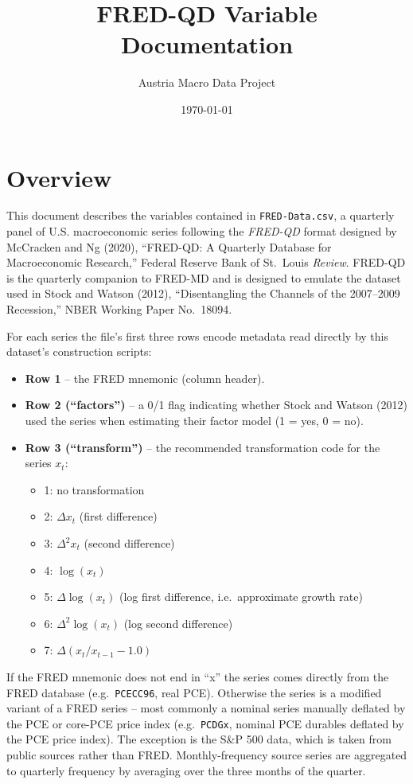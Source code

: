 \documentclass[11pt]{article}
\title{FRED-QD Variable Documentation}
\author{Austria Macro Data Project}
\date{\today}
\begin{document}
\maketitle

\section*{Overview}

This document describes the variables contained in \texttt{FRED-Data.csv}, a
quarterly panel of U.S. macroeconomic series following the \emph{FRED-QD}
format designed by McCracken and Ng (2020), ``FRED-QD: A Quarterly Database
for Macroeconomic Research,'' Federal Reserve Bank of St.\ Louis \emph{Review}.
FRED-QD is the quarterly companion to FRED-MD and is designed to emulate the
dataset used in Stock and Watson (2012), ``Disentangling the Channels of the
2007--2009 Recession,'' NBER Working Paper No.\ 18094.

For each series the file's first three rows encode metadata read directly by
this dataset's construction scripts:
\begin{itemize}
  \item \textbf{Row 1} -- the FRED mnemonic (column header).
  \item \textbf{Row 2 (``factors'')} -- a 0/1 flag indicating whether Stock
    and Watson (2012) used the series when estimating their factor model
    (1 = yes, 0 = no).
  \item \textbf{Row 3 (``transform'')} -- the recommended transformation
    code for the series $x_t$:
    \begin{itemize}
      \item 1: no transformation
      \item 2: $\Delta x_t$ (first difference)
      \item 3: $\Delta^2 x_t$ (second difference)
      \item 4: $\log(x_t)$
      \item 5: $\Delta \log(x_t)$ (log first difference, i.e.\ approximate growth rate)
      \item 6: $\Delta^2 \log(x_t)$ (log second difference)
      \item 7: $\Delta(x_t/x_{t-1} - 1.0)$
    \end{itemize}
\end{itemize}

If the FRED mnemonic does not end in ``x'' the series comes directly from the
FRED database (e.g.\ \texttt{PCECC96}, real PCE). Otherwise the series is a
modified variant of a FRED series -- most commonly a nominal series manually
deflated by the PCE or core-PCE price index (e.g.\ \texttt{PCDGx}, nominal PCE
durables deflated by the PCE price index). The exception is the S\&P 500
data, which is taken from public sources rather than FRED. Monthly-frequency
source series are aggregated to quarterly frequency by averaging over the
three months of the quarter.
\end{document}
